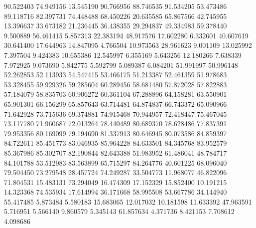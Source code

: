 90.522403
74.949156
13.545190
90.766956
88.746535
91.534205
53.473486
89.118716
82.397731
74.448488
68.450226
20.635585
65.867566
42.745955
13.396637
33.673182
21.236445
36.438355
29.294837
49.334983
59.378440
9.500889
56.461415
5.857313
22.383194
48.917576
17.602280
6.332601
40.607619
30.641400
17.644963
14.847095
4.766504
10.973563
28.961623
9.001109
13.025992
7.397504
9.424383
10.655386
12.545997
6.355169
5.643256
12.180266
7.638339
7.972925
9.073690
5.842775
5.592799
5.089387
6.084201
51.991997
50.996148
52.262853
52.113933
54.547415
53.466175
51.213387
52.461359
51.978683
53.328455
59.929326
59.285604
60.289456
58.681480
57.872028
57.822883
57.184079
58.835703
60.906272
60.361104
67.288896
64.158281
63.550901
65.901301
66.156299
65.857643
63.714481
64.874837
66.743372
65.090966
71.642928
73.715636
69.374881
74.915468
70.944957
72.418447
75.467045
73.117780
71.960687
72.013264
78.440489
80.689370
78.628486
77.837391
79.953356
80.169099
79.194690
81.337913
80.646945
80.073586
84.859397
84.722611
85.451773
83.046935
85.964228
84.633501
84.345768
83.952579
85.367986
85.302707
82.190844
82.643388
51.983952
61.486041
48.784717
84.101788
53.512983
83.563899
65.715297
84.264776
40.601225
68.096040
79.504450
73.279548
28.457724
74.249287
33.504773
11.968077
46.822096
71.804531
15.483131
73.294049
16.474309
17.152329
15.852400
10.191215
14.323368
74.535934
17.614994
36.171668
58.995508
53.667786
34.144940
55.417485
5.873484
5.580183
15.683065
12.017032
10.181598
11.633392
47.963591
5.716951
5.566140
9.860579
5.345143
61.857634
4.371736
8.421153
7.708612
4.098686
